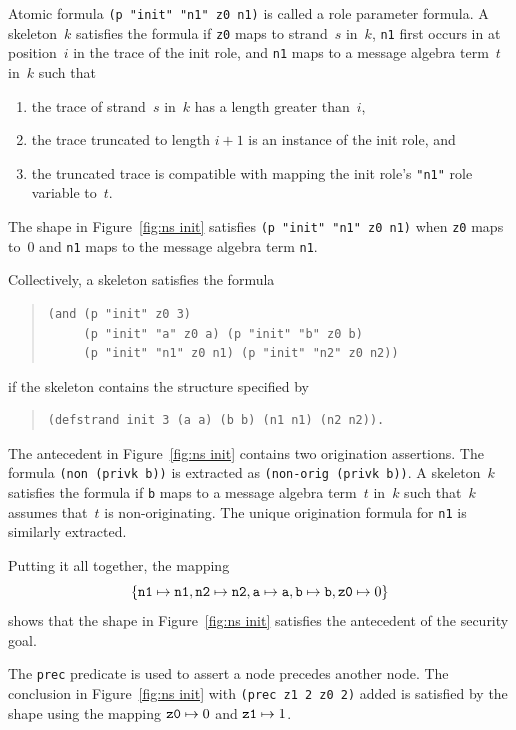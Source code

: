 Atomic formula \texttt{(p "init" "n1" z0 n1)} is called a role
parameter formula.  A skeleton~$k$ satisfies the formula if
\texttt{z0} maps to strand~$s$ in~$k$, \texttt{n1} first occurs in at
position~$i$ in the trace of the init role, and \texttt{n1} maps to a
message algebra term~$t$ in~$k$ such that
\begin{enumerate}
\item the trace of strand~$s$ in~$k$ has a length greater than~$i$,
\item the trace truncated to length $i+1$ is an instance of the
  init role, and
\item the truncated trace is compatible with mapping the init role's
  \texttt{"n1"} role variable to~$t$.
\end{enumerate}
The shape in Figure~\ref{fig:ns init} satisfies \texttt{(p "init" "n1"
  z0 n1)} when \texttt{z0} maps to~0 and \texttt{n1} maps to the
message algebra term \texttt{n1}.

Collectively, a skeleton satisfies the formula
\begin{quote}
\begin{verbatim}
(and (p "init" z0 3)
     (p "init" "a" z0 a) (p "init" "b" z0 b)
     (p "init" "n1" z0 n1) (p "init" "n2" z0 n2))
\end{verbatim}
\end{quote}
if the skeleton contains the structure specified by
\begin{quote}
\begin{verbatim}
(defstrand init 3 (a a) (b b) (n1 n1) (n2 n2)).
\end{verbatim}
\end{quote}

The antecedent in Figure~\ref{fig:ns init} contains two origination
assertions.  The formula \texttt{(non (privk b))} is extracted as
\texttt{(non-orig (privk b))}.  A skeleton~$k$ satisfies the formula if
\texttt{b} maps to a message algebra term~$t$ in~$k$ such that~$k$
assumes that~$t$ is non-originating.  The unique origination formula for
\texttt{n1} is similarly extracted.

Putting it all together, the mapping
\[\{\mathtt{n1}\mapsto\mathtt{n1},
\mathtt{n2}\mapsto\mathtt{n2}, \mathtt{a}\mapsto\mathtt{a},
\mathtt{b}\mapsto\mathtt{b},\mbox{\tt z0}\mapsto0\}\] shows that
the shape in Figure~\ref{fig:ns init} satisfies the antecedent of the
security goal.

The \texttt{prec} predicate is used to assert a node precedes another
node.  The conclusion in Figure~\ref{fig:ns init} with \texttt{(prec
  z1 2 z0 2)} added is satisfied by the shape using the mapping
$\mbox{\tt z0}\mapsto0$ and $\mbox{\tt z1}\mapsto1$.

